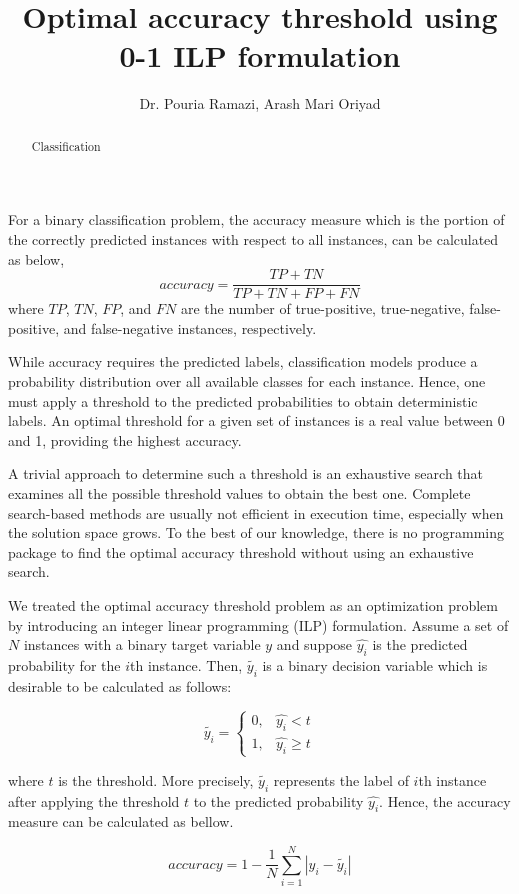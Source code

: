 \documentclass[a4paper]{article}
\title{Optimal accuracy threshold using 0-1 ILP formulation}
\date{}
\author{Dr. Pouria Ramazi, Arash Mari Oriyad}
\begin{document}
\maketitle

\begin{abstract}
Classification 
\end{abstract}

For a binary classification problem, the accuracy measure which is the portion of the correctly predicted instances with respect to all instances, can be calculated as below,
\[
accuracy = \frac{TP + TN}{TP + TN + FP + FN}
\]
where $TP$, $TN$, $FP$, and $FN$ are the number of true-positive, true-negative, false-positive, and false-negative instances, respectively.

While accuracy requires the predicted labels, classification models produce a probability distribution over all available classes for each instance. Hence, one must apply a threshold to the predicted probabilities to obtain deterministic labels. An optimal threshold for a given set of instances is a real value between 0 and 1, providing the highest accuracy.

A trivial approach to determine such a threshold is an exhaustive search that examines all the possible threshold values to obtain the best one. Complete search-based methods are usually not efficient in execution time, especially when the solution space grows. To the best of our knowledge, there is no programming package to find the optimal accuracy threshold without using an exhaustive search.

We treated the optimal accuracy threshold problem as an optimization problem by introducing an integer linear programming (ILP) formulation. Assume a set of $N$ instances with a binary target variable $y$ and suppose $\hat{y_i}$ is the predicted probability for the $i$th instance. Then, $\tilde{y_i}$ is a binary decision variable which is desirable to be calculated as follows:

\[
\tilde{y_i} = 
\begin{cases}
0, & \hat{y_i} < t \\
1, & \hat{y_i} \ge t
\end{cases}
\]

where $t$ is the threshold. More precisely, $\tilde{y_i}$ represents the label of $i$th instance after applying the threshold $t$ to the predicted probability $\hat{y_i}$. Hence, the accuracy measure can be calculated as bellow.

\[
accuracy = 1 - \frac{1}{N} \sum_{i=1}^{N} |y_i - \tilde{y_i}|
\]
\end{document}
